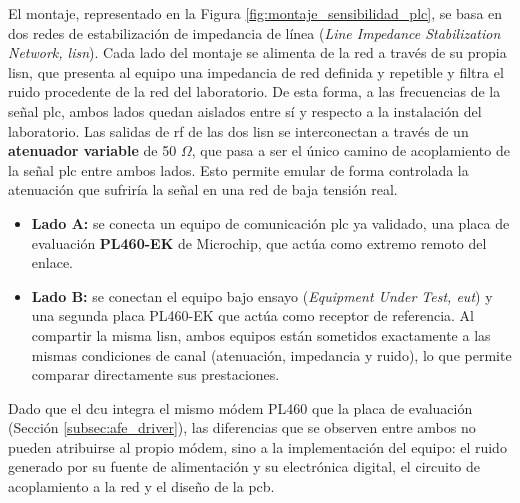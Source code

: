 El montaje, representado en la Figura \ref{fig:montaje_sensibilidad_plc}, se basa en dos redes de estabilización de impedancia de línea (\textit{Line Impedance Stabilization Network, \gls{lisn}}). Cada lado del montaje se alimenta de la red a través de su propia \gls{lisn}, que presenta al equipo una impedancia de red definida y repetible y filtra el ruido procedente de la red del laboratorio. De esta forma, a las frecuencias de la señal \gls{plc}, ambos lados quedan aislados entre sí y respecto a la instalación del laboratorio. Las salidas de \gls{rf} de las dos \gls{lisn} se interconectan a través de un \textbf{atenuador variable} de 50 $\Omega$, que pasa a ser el único camino de acoplamiento de la señal \gls{plc} entre ambos lados. Esto permite emular de forma controlada la atenuación que sufriría la señal en una red de baja tensión real.

\begin{itemize}
    \item \textbf{Lado A:} se conecta un equipo de comunicación \gls{plc} ya validado, una placa de evaluación \textbf{PL460-EK} de Microchip, que actúa como extremo remoto del enlace.
    \item \textbf{Lado B:} se conectan el equipo bajo ensayo (\textit{Equipment Under Test, \gls{eut}}) y una segunda placa PL460-EK que actúa como receptor de referencia. Al compartir la misma \gls{lisn}, ambos equipos están sometidos exactamente a las mismas condiciones de canal (atenuación, impedancia y ruido), lo que permite comparar directamente sus prestaciones.
\end{itemize}

Dado que el \gls{dcu} integra el mismo módem PL460 que la placa de evaluación (Sección \ref{subsec:afe_driver}), las diferencias que se observen entre ambos no pueden atribuirse al propio módem, sino a la implementación del equipo: el ruido generado por su fuente de alimentación y su electrónica digital, el circuito de acoplamiento a la red y el diseño de la \gls{pcb}.

